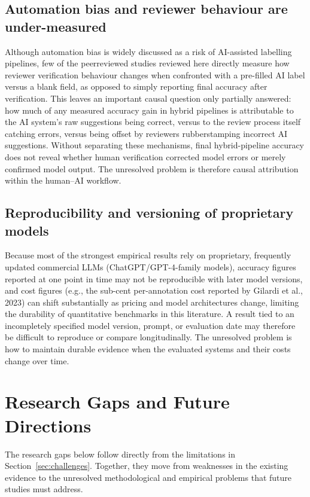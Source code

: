 \documentclass[acmsmall,nonacm]{acmart}
\begin{document}
\subsection{Automation bias and reviewer behaviour are under-measured}
\label{subsec:reviewer-behaviour}

Although automation bias is widely discussed as a risk of AI-assisted labelling pipelines, few of the peerreviewed studies reviewed here directly measure how reviewer verification behaviour changes when confronted with a pre-filled AI label versus a blank field, as opposed to simply reporting final accuracy after verification. This leaves an important causal question only partially answered: how much of any measured accuracy gain in hybrid pipelines is attributable to the AI system's raw suggestions being correct, versus to the review process itself catching errors, versus being offset by reviewers rubberstamping incorrect AI suggestions. Without separating these mechanisms, final hybrid-pipeline accuracy does not reveal whether human verification corrected model errors or merely confirmed model output. The unresolved problem is therefore causal attribution within the human--AI workflow.

\subsection{Reproducibility and versioning of proprietary models}
\label{subsec:reproducibility}

Because most of the strongest empirical results rely on proprietary, frequently updated commercial LLMs (ChatGPT/GPT-4-family models), accuracy figures reported at one point in time may not be reproducible with later model versions, and cost figures (e.g., the sub-cent per-annotation cost reported by Gilardi et al., 2023) can shift substantially as pricing and model architectures change, limiting the durability of quantitative benchmarks in this literature. A result tied to an incompletely specified model version, prompt, or evaluation date may therefore be difficult to reproduce or compare longitudinally. The unresolved problem is how to maintain durable evidence when the evaluated systems and their costs change over time.

\section{Research Gaps and Future Directions}
\label{sec:future-directions}

The research gaps below follow directly from the limitations in Section~\ref{sec:challenges}. Together, they move from weaknesses in the existing evidence to the unresolved methodological and empirical problems that future studies must address.
\end{document}

